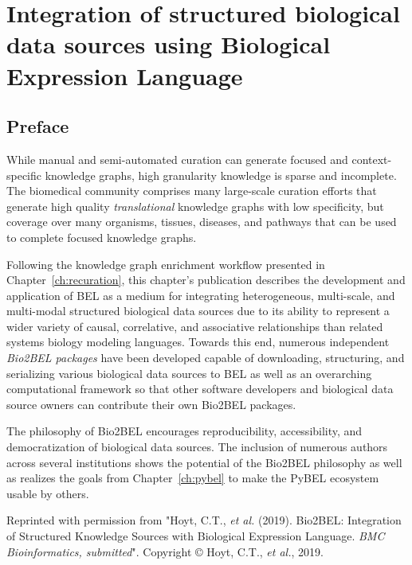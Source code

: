 \chapter{Integration of structured biological data sources using Biological Expression Language}
\label{ch:bio2bel}

\section*{Preface}

While manual and semi-automated curation can generate focused and context-specific knowledge graphs, high granularity knowledge is sparse and incomplete.
The biomedical community comprises many large-scale curation efforts that generate high quality \textit{translational} knowledge graphs with low specificity, but coverage over many organisms, tissues, diseases, and pathways that can be used to complete focused knowledge graphs.

Following the knowledge graph enrichment workflow presented in Chapter~\ref{ch:recuration}, this chapter's publication describes the development and application of \ac{BEL} as a medium for integrating heterogeneous, multi-scale, and multi-modal structured biological data sources due to its ability to represent a wider variety of causal, correlative, and associative relationships than related systems biology modeling languages.
Towards this end, numerous independent \textit{Bio2BEL packages} have been developed capable of downloading, structuring, and serializing various biological data sources to \ac{BEL} as well as an overarching computational framework so that other software developers and biological data source owners can contribute their own Bio2BEL packages.

The philosophy of Bio2BEL encourages reproducibility, accessibility, and democratization of biological data sources.
The inclusion of numerous authors across several institutions shows the potential of the Bio2BEL philosophy as well as realizes the goals from Chapter~\ref{ch:pybel} to make the PyBEL ecosystem usable by others.

\vspace*{\fill}

Reprinted with permission from "Hoyt, C.T., \textit{et al.} (2019). Bio2BEL: Integration of Structured Knowledge Sources with Biological Expression Language. \textit{BMC Bioinformatics, submitted}".
Copyright © Hoyt, C.T., \textit{et al.}, 2019.




